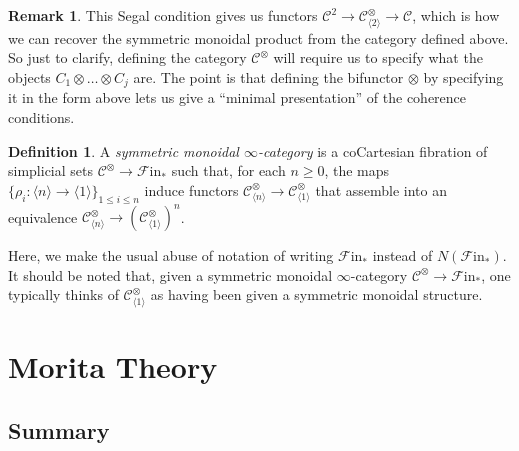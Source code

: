 \documentclass[letterpaper]{article}
\theoremstyle{definition}
\newtheorem{definition}[lemma]{Definition}
\newtheorem{remark}[lemma]{Remark}
\newcommand{\mc}{\mathcal}
\begin{document}
\begin{remark}
This Segal condition gives us functors $\mc C^2 \rightarrow \mc
C^{\otimes}_{\langle 2 \rangle} \xrightarrow{} \mc C$, which is how we
can recover the symmetric monoidal product from the category defined
above. So just to clarify, defining the category $\mc C^\otimes$ will
require us to specify what the objects $ C_1 \otimes \dots \otimes
C_j$ are. The point is that defining the bifunctor $\otimes$ by
specifying it in the form above lets us give a ``minimal
presentation'' of the coherence conditions.
\end{remark}

\begin{definition}
    A \emph{symmetric monoidal $\infty$-category} is a coCartesian fibration of simplicial sets $\mathcal{C}^\otimes \to \mathscr{F}\mathrm{in}_*$ such that, for each $n \geq 0$, the maps $\{\rho_i : \langle n \rangle \to \langle 1 \rangle \}_{1 \leq i \leq n}$ induce functors $\mathcal{C}^\otimes_{\langle n \rangle} \to \mathcal{C}^\otimes_{\langle 1 \rangle}$ that assemble into an equivalence $\mathcal{C}^\otimes_{\langle n \rangle} \to (\mathcal{C}^\otimes_{\langle 1 \rangle})^n$.
\end{definition}

Here, we make the usual abuse of notation of writing
$\mathscr{F}\mathrm{in}_*$ instead of
$N(\mathscr{F}\mathrm{in}_*)$. It should be noted that, given a
symmetric monoidal $\infty$-category $\mathcal{C}^\otimes \to
\mathscr{F}\mathrm{in}_*$, one typically thinks of
$\mathcal{C}^\otimes_{\langle 1 \rangle}$ as having been given a
symmetric monoidal structure.

\section{Morita Theory}

\subsection{Summary}
\end{document}
